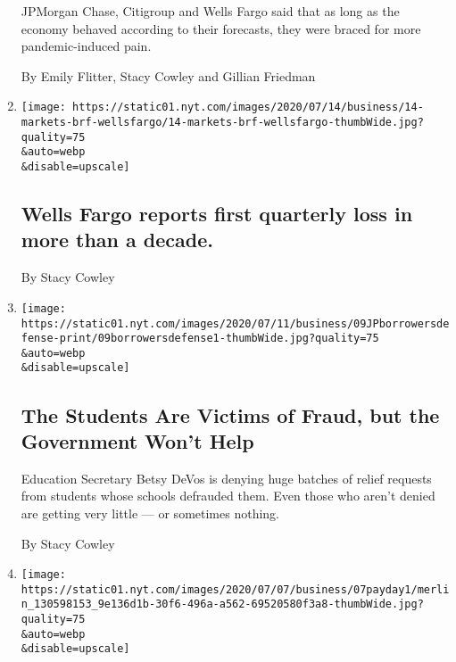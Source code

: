 \begin{enumerate}
  JPMorgan Chase, Citigroup and Wells Fargo said that as long as the
  economy behaved according to their forecasts, they were braced for
  more pandemic-induced pain.

  By Emily Flitter, Stacy Cowley and Gillian Friedman
\item
  \href{/2020/07/14/business/wells-fargo-reports-first-quarterly-loss-in-more-than-a-decade.html}{}

  \texttt{[image: https://static01.nyt.com/images/2020/07/14/business/14-markets-brf-wellsfargo/14-markets-brf-wellsfargo-thumbWide.jpg?quality=75\\\&auto=webp\\\&disable=upscale]}

  \hypertarget{wells-fargo-reports-first-quarterly-loss-in-more-than-a-decade}{%
  \subsection{Wells Fargo reports first quarterly loss in more than a
  decade.}\label{wells-fargo-reports-first-quarterly-loss-in-more-than-a-decade}}

  By Stacy Cowley
\item
  \href{/2020/07/10/business/student-loans-betsy-devos-borrower-defense.html}{}

  \texttt{[image: https://static01.nyt.com/images/2020/07/11/business/09JPborrowersdefense-print/09borrowersdefense1-thumbWide.jpg?quality=75\\\&auto=webp\\\&disable=upscale]}

  \hypertarget{the-students-are-victims-of-fraud-but-the-government-wont-help}{%
  \subsection{The Students Are Victims of Fraud, but the Government
  Won't
  Help}\label{the-students-are-victims-of-fraud-but-the-government-wont-help}}

  Education Secretary Betsy DeVos is denying huge batches of relief
  requests from students whose schools defrauded them. Even those who
  aren't denied are getting very little --- or sometimes nothing.

  By Stacy Cowley
\item
  \href{/2020/07/07/business/payday-consumer-financial-protection-bureau.html}{}

  \texttt{[image: https://static01.nyt.com/images/2020/07/07/business/07payday1/merlin\_130598153\_9e136d1b-30f6-496a-a562-69520580f3a8-thumbWide.jpg?quality=75\\\&auto=webp\\\&disable=upscale]}

  \hypertarget{consumer-bureau-scraps-restrictions-on-payday-loans}{%
}
\end{enumerate}
